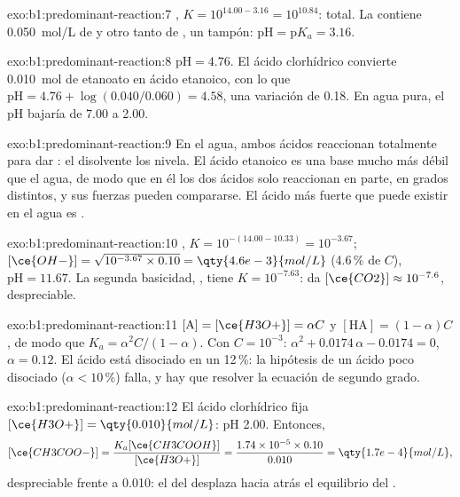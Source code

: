\begin{solution}{exo:b1:predominant-reaction:7}
, $K = 10^{14.00 - 3.16} = 10^{10.84}$: total.
La  contiene \qty{0.050}{mol/L} de  y otro
tanto de , un tampón: $\mathrm{pH} = \mathrm{p}K_a = 3.16$.
\end{solution}

\begin{solution}{exo:b1:predominant-reaction:8}
$\mathrm{pH} = 4.76$. El ácido clorhídrico convierte \qty{0.010}{mol} de
etanoato en ácido etanoico, con lo que $\mathrm{pH} = 4.76 + \log(0.040/0.060) = 4.58$, una
variación de 0.18. En agua pura, el pH bajaría de 7.00 a 2.00.
\end{solution}

\begin{solution}{exo:b1:predominant-reaction:9}
En el agua, ambos ácidos reaccionan totalmente para dar : el
disolvente los nivela. El ácido etanoico es una base mucho más débil que
el agua, de modo que en él los dos ácidos solo reaccionan en parte, en
grados distintos, y sus fuerzas pueden compararse. El ácido más fuerte
que puede existir en el agua es .
\end{solution}

\begin{solution}{exo:b1:predominant-reaction:10}
, $K = 10^{-(14.00 - 10.33)} = 10^{-3.67}$;
$[\ce{OH-}] = \sqrt{10^{-3.67} \times 0.10} = \qty{4.6e-3}{mol/L}$ (4.6\,\%
de $C$), $\mathrm{pH} = 11.67$. La segunda basicidad, , tiene $K = 10^{-7.63}$: da $[\ce{CO2}] \approx
10^{-7.6}$, despreciable.
\end{solution}

\begin{solution}{exo:b1:predominant-reaction:11}
$[\mathrm{A}] = [\ce{H3O+}] = \alpha C$ y $[\mathrm{HA}] = (1 - \alpha)C$,
de modo que $K_a = \alpha^2C/(1 - \alpha)$. Con $C = 10^{-3}$: $\alpha^2 +
0.0174\,\alpha - 0.0174 = 0$, $\alpha = 0.12$. El ácido está disociado en
un 12\,\%: la hipótesis de un ácido poco disociado ($\alpha <
10\,\%$) falla, y hay que resolver la ecuación de segundo grado.
\end{solution}

\begin{solution}{exo:b1:predominant-reaction:12}
El ácido clorhídrico fija $[\ce{H3O+}] = \qty{0.010}{mol/L}$: pH 2.00.
Entonces,
\[
  [\ce{CH3COO-}] = \frac{K_a[\ce{CH3COOH}]}{[\ce{H3O+}]} = \frac{1.74 \times 10^{-5}
  \times 0.10}{0.010} = \qty{1.7e-4}{mol/L},
\]
despreciable frente a 0.010: el  del  desplaza hacia
atrás el equilibrio del .
\end{solution}

